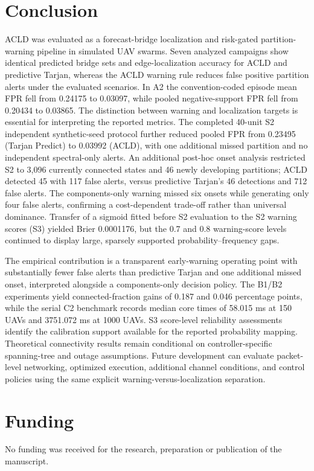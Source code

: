 \documentclass[preprint,12pt]{elsarticle}
\theoremstyle{definition}\newtheorem{definition}{Definition}
\theoremstyle{plain}\newtheorem{theorem}{Theorem}
\theoremstyle{plain}\newtheorem{lemma}{Lemma}
\theoremstyle{plain}\newtheorem{corollary}{Corollary}
\theoremstyle{plain}\newtheorem{assumption}{Assumption}
\theoremstyle{remark}\newtheorem{remark}[theorem]{Remark}
\begin{document}
\section{Conclusion}
\label{sec:Conclusion}
ACLD was evaluated as a forecast-bridge localization and risk-gated partition-warning pipeline in simulated UAV swarms. Seven analyzed campaigns show identical predicted bridge sets and edge-localization accuracy for ACLD and predictive Tarjan, whereas the ACLD warning rule reduces false positive partition alerts under the evaluated scenarios. In A2 the convention-coded episode mean FPR fell from 0.24175 to 0.03097, while pooled negative-support FPR fell from 0.20434 to 0.03865. The distinction between warning and localization targets is essential for interpreting the reported metrics. The completed 40-unit S2 independent synthetic-seed protocol further reduced pooled FPR from 0.23495 (Tarjan Predict) to 0.03992 (ACLD), with one additional missed partition and no independent spectral-only alerts. An additional post-hoc onset analysis restricted S2 to 3,096 currently connected states and 46 newly developing partitions; ACLD detected 45 with 117 false alerts, versus predictive Tarjan's 46 detections and 712 false alerts. The components-only warning missed six onsets while generating only four false alerts, confirming a cost-dependent trade-off rather than universal dominance. Transfer of a sigmoid fitted before S2 evaluation to the S2 warning scores (S3) yielded Brier 0.0001176, but the 0.7 and 0.8 warning-score levels continued to display large, sparsely supported probability--frequency gaps.

The empirical contribution is a transparent early-warning operating point with substantially fewer false alerts than predictive Tarjan and one additional missed onset, interpreted alongside a components-only decision policy. The B1/B2 experiments yield connected-fraction gains of 0.187 and 0.046 percentage points, while the serial C2 benchmark records median core times of 58.015 ms at 150 UAVs and 3751.072 ms at 1000 UAVs. S3 score-level reliability assessments identify the calibration support available for the reported probability mapping. Theoretical connectivity results remain conditional on controller-specific spanning-tree and outage assumptions. Future development can evaluate packet-level networking, optimized execution, additional channel conditions, and control policies using the same explicit warning-versus-localization separation.


\section*{Funding}
No funding was received for the research, preparation or publication of the manuscript.
\end{document}
